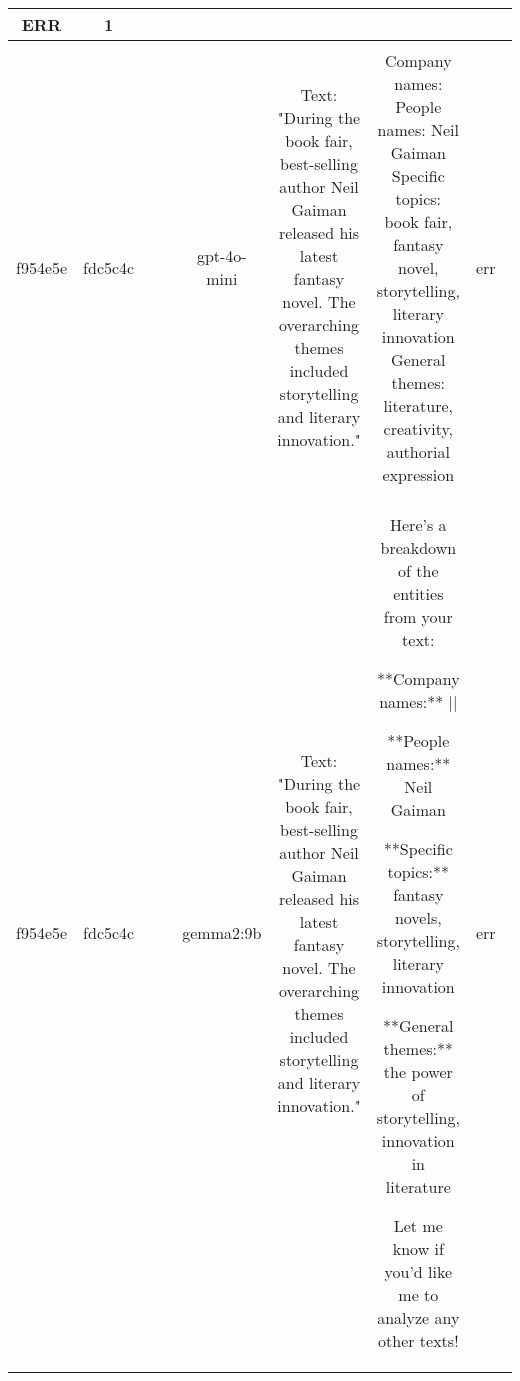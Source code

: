 \begin{table}[h!]
\begin{tabular}{|c|c|c|c|c|c|c|c|c|c|}
ERR & 1\\
\hline
f954e5e & fdc5c4c &  &  & gpt-4o-mini & Text: "During the book fair, best-selling author Neil Gaiman released his latest fantasy novel. The overarching themes included storytelling and literary innovation." & Company names: 
People names: Neil Gaiman
Specific topics: book fair, fantasy novel, storytelling, literary innovation
General themes: literature, creativity, authorial expression & err & The chatbot output does not comply with the desired format stated in the description. The format requires that each category ("Company names", "People names", "Specific topics", "General themes") should have a comma-separated list if applicable, and should follow with a "-||-" if not applicable. In this output:

1. "Company names" is left blank and does not use the "-||-" as specified in the format.
2. "People names", "Specific topics", and "General themes" comply with the format since the format error only applies to the "Company names" section.

Based on these observations, there is a violation of the required format for "Company names".

ERR & 1\\
\hline
f954e5e & fdc5c4c &  &  & gemma2:9b & Text: "During the book fair, best-selling author Neil Gaiman released his latest fantasy novel. The overarching themes included storytelling and literary innovation." & Here's a breakdown of the entities from your text:

**Company names:**  || 

**People names:** Neil Gaiman 

**Specific topics:** fantasy novels, storytelling, literary innovation

**General themes:**  the power of storytelling,  innovation in literature


Let me know if you'd like me to analyze any other texts! 
 & err & In evaluating the compliance of the chatbot output with the description, I've noticed that the description specifies a desired format for output which includes a comma-separated list for each category: Company names, People names, Specific topics, and General themes. It uses the format: 
Company names: <comma_separated_list_of_company_names>
People names: -||-
Specific topics: -||-
General themes: -||-

1. **Company names**: It should be preceded by a colon followed by a comma-separated list. The output shows "||", which is not part of the described output format. This is considered a violation.
   

\end{tabular}
\end{table}

